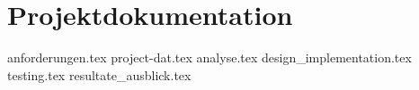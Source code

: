 \begin{comment}
Daher gelten folgende Regelungen zur Weiterentwicklung (gilt auch für andere Projektarten):
 Weiterentwicklung ist obligatorisch und erscheint in zwei separaten Kapitel (ggf. Dokument): Im Technischen Bericht, Unterkapitel Resultate/Ausblick, und in der SW-Projektdokumentation.
 Weiterentwicklung im Technischen Bericht ist allgemein gehalten und daher weniger heikel. Wichtig ist die Aufzählung der hauptsächlichen weiteren möglichen funktionalen oder nicht-funktionalen Anforderungen.
 Weiterentwicklung in der SW-Projektdokumentation ist an Architekten / SW-Entwickler gerichtet wie jedes andere SW-Dokument.
 Gewichtung: Es wird separat bewertet und zusätzlich erst spät (SA/DA bei der Präsentation) vollständig abgegeben wird. Spät heisst bei DAs auf der Dokumentation der Präsentation (inkl. CD). Sein ungewichtetes Gewicht gegenüber der Gesamtdokumentation ist umfangmässig ca. 1/15. Zur Erinnerung siehe Unterkapitel Lieferdokumente mit ca. 15 Hauptkapitel-/-Dokumenten.
2.3.10 Benutzerdokumentation
Installationsanleitung(en), Bedienungsanleitung(en) und Tutorien (evtl. in den Anhang)! Vergessen Sie a) nicht den CD-Inhalt zu notieren und auch in die Doku. zu nehmen.
Testen sie die Installation mit realistischen Vorgaben!!
2.4.1 Allgemeines
 Normen
 Konfigurationsmanagement (Entwicklungs-Werkzeuge, Eingesetzte Software)
2.4.2 Projektmanagement
Enthält folgende mögliche Unterkapitel:
 Vorgehen
 Zeitplanung
 (Erreichen der Ziele siehe sep. Kapitel "Bewertung und Ausblick").
Zeitplanung: Die Zeitplanung orientiert sich an den Meilensteinen und ist nach folgender Idee strukturiert:
     Inception => Elaboration => Construction 1 => Construction 2 => ... => Transition
Das ergibt folgendes Zeitdiagramm:
￼2.4.3
                          Dokumente
Dokumente Teil I:             |
+ Einführung                  |
+ Vision                      |
+ "Stand der Technik"         |
+ Umsetzungskonzept           |
+ Resultate                   |
Dokumente Teil II:            |
+ Anforderungsspezifikation   |
+ Analyse                     |
+ Design                      |
+ Implementation              |
+ Projektmgmt.&-Monitoring    |
+ Test                        |
+ Resultate und Weiterentw.   |
+ Benutzerdokumentation       |
+ Glossar und Abkürzungsverz. |
+ Literatur- und Quellenverz. |
                              +----+------+---------+---------+------> Tage
               Zeitabschnitte: Inc.  Elab.  Constr.1  Constr.2  Trans.
Projektmonitoring
Code-Analyse (Metriken).
\end{comment}

\part{Projektdokumentation}

{anforderungen.tex}
{project-dat.tex}
{analyse.tex}
{design_implementation.tex}
{testing.tex}
{resultate_ausblick.tex}

